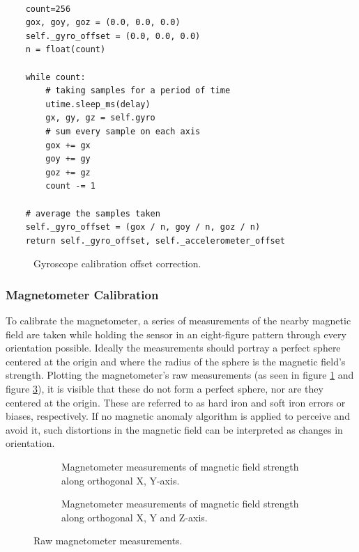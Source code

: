 \lstset{language=Python}

\begin{lstlisting}[frame=single]  % Start your code-block

    count=256
    gox, goy, goz = (0.0, 0.0, 0.0)
    self._gyro_offset = (0.0, 0.0, 0.0) 
    n = float(count)

    while count:
        # taking samples for a period of time
        utime.sleep_ms(delay)
        gx, gy, gz = self.gyro
        # sum every sample on each axis
        gox += gx
        goy += gy
        goz += gz
        count -= 1

    # average the samples taken
    self._gyro_offset = (gox / n, goy / n, goz / n)
    return self._gyro_offset, self._accelerometer_offset
\end{lstlisting}

\begin{figure}[!h]
  \centering
  \resizebox{1\linewidth}{!}{}
  \caption{Gyroscope calibration offset correction.}
\end{figure}

\subsubsection{Magnetometer Calibration}

To calibrate the magnetometer, a series of measurements of the nearby magnetic field are taken while holding the sensor in an eight-figure pattern through every orientation possible. Ideally the measurements should portray a perfect sphere centered at the origin and where the radius of the sphere is the magnetic field's strength. Plotting the magnetometer's raw measurements (as seen in figure \ref{plt:raw_magnetometer} and figure \ref{plt:raw_magnetometer3D}), it is visible that these do not form a perfect sphere, nor are they centered at the origin. These are referred to as hard iron and soft iron errors or biases, respectively. If no magnetic anomaly algorithm is applied to perceive and avoid it, such distortions in the magnetic field can be interpreted as changes in orientation.

\begin{figure}[!h]
  \centering
  \begin{subfigure}{0.7\textwidth}
    \centering
    \resizebox{1\linewidth}{!}{}
    \caption{Magnetometer measurements of magnetic field strength along orthogonal X, Y-axis.}
    \label{plt:raw_magnetometer}
  \end{subfigure}

  \begin{subfigure}{0.7\textwidth}
    \centering
    \resizebox{1\linewidth}{!}{}
    \caption{Magnetometer measurements of magnetic field strength along orthogonal X, Y and Z-axis.}
    \label{plt:raw_magnetometer3D}
  \end{subfigure}
  \caption{Raw magnetometer measurements.}
\end{figure}

